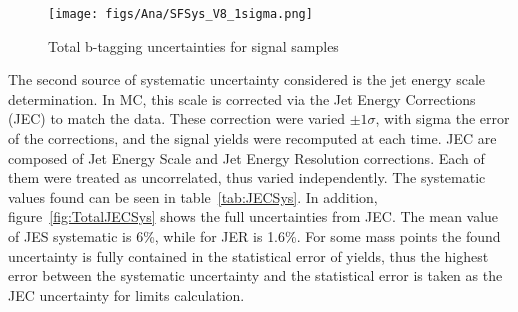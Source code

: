 \begin{figure}[!Hhtbp]
  \begin{center}
    \texttt{[image: figs/Ana/SFSys\_V8\_1sigma.png]}
    \caption{Total b-tagging uncertainties for signal samples}
    \label{fig:TotalSFSys}
  \end{center}
\end{figure}

The second source of systematic uncertainty considered is the jet energy scale determination. In MC, this scale is corrected via the Jet Energy Corrections (JEC) to match the data. These correction were varied $\pm 1\sigma$, with sigma the error of the corrections, and the signal yields were recomputed at each time. JEC are composed of Jet Energy Scale and Jet Energy Resolution corrections. Each of them were treated as uncorrelated, thus varied independently. The systematic values found can be seen in table~\ref{tab:JECSys}. In addition, figure~\ref{fig:TotalJECSys} shows the full uncertainties from JEC. The mean value of JES systematic is 6\%, while for JER is 1.6\%. For some mass points the found uncertainty is fully contained in the statistical error of yields, thus the highest error between the systematic uncertainty and the statistical error is taken as the JEC uncertainty for limits calculation.

\begin{table*}[htbH]
\begin{center}
\caption{JEC uncertainties for signal samples\label{tab:JECSys}}
\end{center}
\end{table*}

